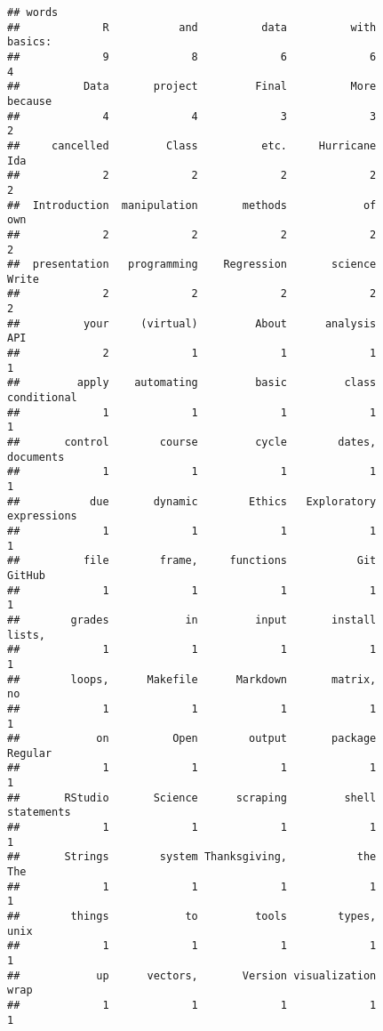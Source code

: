 \documentclass[
]{article}
\begin{document}
\begin{verbatim}
## words
##             R           and          data          with       basics: 
##             9             8             6             6             4 
##          Data       project         Final          More       because 
##             4             4             3             3             2 
##     cancelled         Class          etc.     Hurricane           Ida 
##             2             2             2             2             2 
##  Introduction  manipulation       methods            of           own 
##             2             2             2             2             2 
##  presentation   programming    Regression       science         Write 
##             2             2             2             2             2 
##          your     (virtual)         About      analysis           API 
##             2             1             1             1             1 
##         apply    automating         basic         class   conditional 
##             1             1             1             1             1 
##       control        course         cycle        dates,     documents 
##             1             1             1             1             1 
##           due       dynamic        Ethics   Exploratory   expressions 
##             1             1             1             1             1 
##          file        frame,     functions           Git        GitHub 
##             1             1             1             1             1 
##        grades            in         input       install        lists, 
##             1             1             1             1             1 
##        loops,      Makefile      Markdown       matrix,            no 
##             1             1             1             1             1 
##            on          Open        output       package       Regular 
##             1             1             1             1             1 
##       RStudio       Science      scraping         shell    statements 
##             1             1             1             1             1 
##       Strings        system Thanksgiving,           the           The 
##             1             1             1             1             1 
##        things            to         tools        types,          unix 
##             1             1             1             1             1 
##            up      vectors,       Version visualization          wrap 
##             1             1             1             1             1
\end{verbatim}
\end{document}
